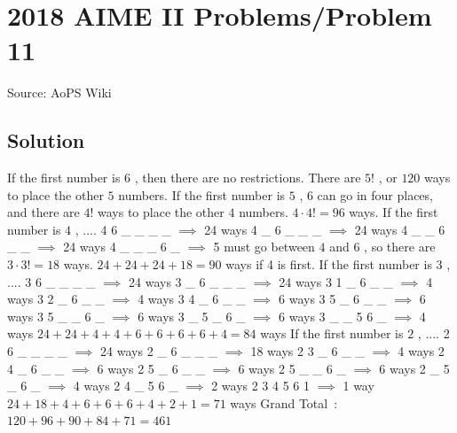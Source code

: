 \documentclass[12pt]{article}
\begin{document}
\section*{{2018 AIME II Problems/Problem 11}}
Source: AoPS Wiki

\subsection*{Solution}
If the first number is $6$ , then there are no restrictions. There are $5!$ , or $120$ ways to place the other $5$ numbers. If the first number is $5$ , $6$ can go in four places, and there are $4!$ ways to place the other $4$ numbers. $4 \cdot 4! = 96$ ways. If the first number is $4$ , .... 4 6 _ _ _ _ $\implies$ 24 ways 4 _ 6 _ _ _ $\implies$ 24 ways 4 _ _ 6 _ _ $\implies$ 24 ways 4 _ _ _ 6 _ $\implies$ 5 must go between $4$ and $6$ , so there are $3 \cdot 3! = 18$ ways. $24 + 24 + 24 + 18 = 90$ ways if 4 is first. If the first number is $3$ , .... 3 6 _ _ _ _ $\implies$ 24 ways 3 _ 6 _ _ _ $\implies$ 24 ways 3 1 _ 6 _ _ $\implies$ 4 ways 3 2 _ 6 _ _ $\implies$ 4 ways 3 4 _ 6 _ _ $\implies$ 6 ways 3 5 _ 6 _ _ $\implies$ 6 ways 3 5 _ _ 6 _ $\implies$ 6 ways 3 _ 5 _ 6 _ $\implies$ 6 ways 3 _ _ 5 6 _ $\implies$ 4 ways $24 + 24 + 4 + 4 + 6 + 6 + 6 + 6 + 4 = 84$ ways If the first number is $2$ , .... 2 6 _ _ _ _ $\implies$ 24 ways 2 _ 6 _ _ _ $\implies$ 18 ways 2 3 _ 6 _ _ $\implies$ 4 ways 2 4 _ 6 _ _ $\implies$ 6 ways 2 5 _ 6 _ _ $\implies$ 6 ways 2 5 _ _ 6 _ $\implies$ 6 ways 2 _ 5 _ 6 _ $\implies$ 4 ways 2 4 _ 5 6 _ $\implies$ 2 ways 2 3 4 5 6 1 $\implies$ 1 way $24 + 18 + 4 + 6 + 6 + 6 + 4 + 2 + 1 = 71$ ways Grand Total : $120 + 96 + 90 + 84 + 71 = \boxed{461}$
\end{document}
